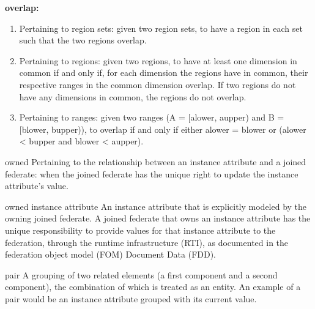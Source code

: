 \par\noindent\textbf{overlap:}\par

\begin{enumerate}[label=\alph*)]
\item Pertaining to region sets: given two region sets, to have a region in each set such that the two regions overlap.
\end{enumerate}

\newpage
\begin{enumerate}[label=\alph*)]
\setcounter{enumi}{1}
\item Pertaining to regions: given two regions, to have at least one dimension in common if and only if, for each dimension the regions have in common, their respective ranges in the common dimension overlap. If two regions do not have any dimensions in common, the regions do not overlap.
\item Pertaining to ranges: given two ranges (A = [alower, aupper) and B = [blower, bupper)), to overlap if and only if either alower = blower or (alower \textless{} bupper and blower \textless{} aupper).
\end{enumerate}


\begin{definition}{owned}
    Pertaining to the relationship between an instance attribute and a joined federate: when the joined federate has the unique right to update the instance attribute's value.
\end{definition}

\begin{definition}{owned instance attribute}
    An instance attribute that is explicitly modeled by the owning joined federate. A joined federate that owns an instance attribute has the unique responsibility to provide values for that instance attribute to the federation, through the runtime infrastructure (RTI), as documented in the federation object model (FOM) Document Data (FDD).
\end{definition}

\begin{definition}{pair}
    A grouping of two related elements (a first component and a second component), the combination of which is treated as an entity. An example of a pair would be an instance attribute grouped with its current value.
\end{definition}

